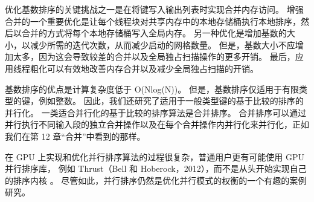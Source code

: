 优化基数排序的关键挑战之一是在将键写入输出列表时实现合并内存访问。 
增强合并的一个重要优化是让每个线程块对共享内存中的本地存储桶执行本地排序，然后以合并的方式将每个本地存储桶写入全局内存。 
另一种优化是增加基数的大小，以减少所需的迭代次数，从而减少启动的网格数量。 
但是，基数大小不应增加太多，因为这会导致较差的合并以及全局独占扫描操作的更多开销。 
最后，应用线程粗化可以有效地改善内存合并以及减少全局独占扫描的开销。

基数排序的优点是计算复杂度低于 O(Nlog(N))。 但是，基数排序仅适用于有限类型的键，例如整数。 
因此，我们还研究了适用于一般类型键的基于比较的排序的并行化。 一类适合并行化的基于比较的排序算法是合并排序。 
合并排序可以通过并行执行不同输入段的独立合并操作以及在每个合并操作内并行化来并行化，正如我们在第 12 章“合并”中看到的那样。

在 GPU 上实现和优化并行排序算法的过程很复杂，普通用户更有可能使用 GPU 并行排序库，
例如 Thrust（Bell 和 Hoberock，2012），而不是从头开始实现自己的排序内核 。 
尽管如此，并行排序仍然是优化并行模式的权衡的一个有趣的案例研究。